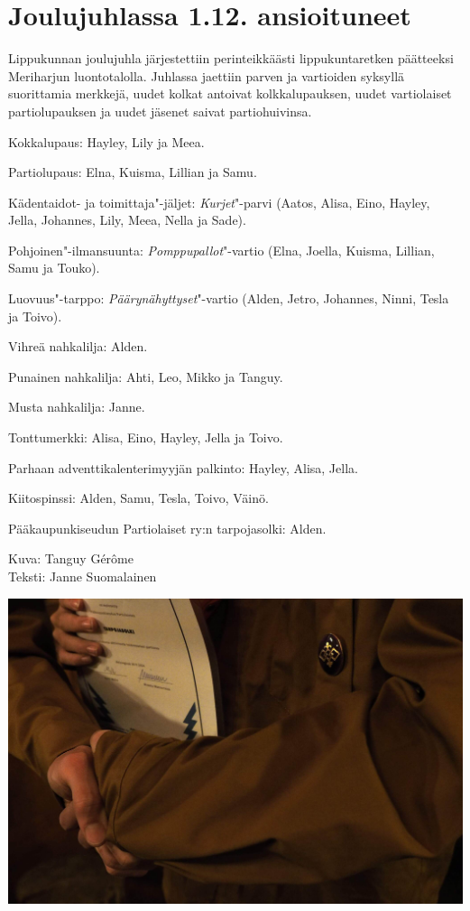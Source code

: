 \section{Joulujuhlassa 1.12. ansioituneet}

\begin{multicols}{2}
\noindent Lippukunnan joulujuhla järjestettiin perinteikkäästi 
lippukuntaretken päätteeksi Meriharjun luontotalolla. Juhlassa jaettiin 
parven ja vartioiden syksyllä suorittamia merkkejä, uudet kolkat antoivat 
kolkkalupauksen, uudet vartiolaiset partiolupauksen ja uudet jäsenet saivat 
partiohuivinsa.

Kokkalupaus: Hayley, Lily ja Meea.

Partiolupaus: Elna, Kuisma, Lillian ja Samu.

Kädentaidot- ja toimittaja"-jäljet: \textit{Kurjet}"-parvi (Aatos, Alisa, 
Eino, Hayley, Jella, Johannes, Lily, Meea, Nella ja Sade).

Pohjoinen"-ilmansuunta: \textit{Pomppupallot}"-vartio (Elna, Joella, Kuisma, 
Lillian, Samu ja Touko).
\columnbreak

Luovuus"-tarppo: \textit{Päärynähyttyset}"-vartio (Alden, Jetro, Johannes, 
Ninni, Tesla ja Toivo).

Vihreä nahkalilja: Alden.

Punainen nahkalilja: Ahti, Leo, Mikko ja Tanguy.

Musta nahkalilja: Janne.

Tonttumerkki: Alisa, Eino, Hayley, Jella ja Toivo.

Parhaan adventtikalenterimyyjän palkinto: Hayley, Alisa, Jella. 

Kiitospinssi: Alden, Samu, Tesla, Toivo, Väinö.

Pääkaupunkiseudun Partiolaiset ry:n tarpojasolki: Alden.

\vspace*{.50cm}
{\raggedleft Kuva: Tanguy Gérôme\\
Teksti: Janne Suomalainen\par}

\vfill

\end{multicols}

\vspace*{.16cm}
\noindent\includegraphics[width=\linewidth,trim={0 0.9cm 0 0.7cm},clip]{assets/pikkujoulu1}


